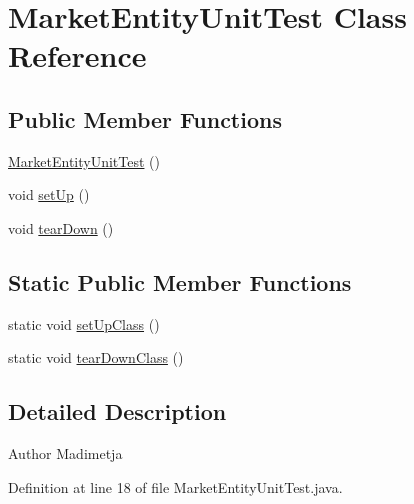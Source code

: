 \hypertarget{class_market_entity_unit_test}{\section{Market\+Entity\+Unit\+Test Class Reference}
\label{class_market_entity_unit_test}
}
\subsection*{Public Member Functions}
\begin{DoxyCompactItemize}
\item 
\hyperlink{class_market_entity_unit_test_abd5946a03ecf362ca65e0372b76b23d6}{Market\+Entity\+Unit\+Test} ()
\item 
void \hyperlink{class_market_entity_unit_test_a146492fa14011135db8b95abaeb1fe48}{set\+Up} ()
\item 
void \hyperlink{class_market_entity_unit_test_abaa756813805984bc9dd42799d2712c4}{tear\+Down} ()
\end{DoxyCompactItemize}
\subsection*{Static Public Member Functions}
\begin{DoxyCompactItemize}
\item 
static void \hyperlink{class_market_entity_unit_test_a55db93367ff6381d89024a48ab61b7e3}{set\+Up\+Class} ()
\item 
static void \hyperlink{class_market_entity_unit_test_a0fc27471ace003490b7088fd122a73a8}{tear\+Down\+Class} ()
\end{DoxyCompactItemize}


\subsection{Detailed Description}
\begin{DoxyAuthor}{Author}
Madimetja 
\end{DoxyAuthor}


Definition at line 18 of file Market\+Entity\+Unit\+Test.\+java.




